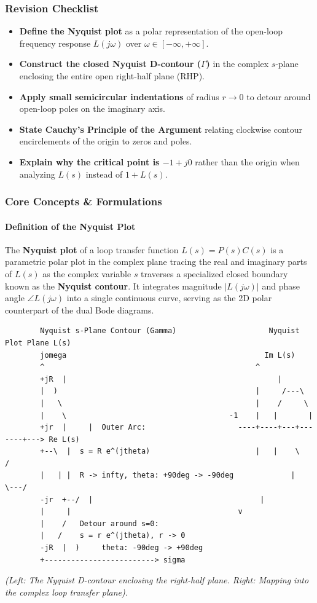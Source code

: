 \documentclass[12pt,onecolumn,twoside ]{article}
\begin{document}
	\subsubsection{Revision Checklist}
	\begin{itemize}
		\item[$\square$]
		\textbf{Define the Nyquist plot} as a polar representation of the open-loop frequency response $L(j\omega)$ over $\omega \in [-\infty, +\infty]$.
		\item[$\square$]
		\textbf{Construct the closed Nyquist D-contour ($\Gamma$)} in the complex $s$-plane enclosing the entire open right-half plane (RHP).
		\item[$\square$]
		\textbf{Apply small semicircular indentations} of radius $r \to 0$ to detour around open-loop poles on the imaginary axis.
		\item[$\square$]
		\textbf{State Cauchy’s Principle of the Argument} relating clockwise contour encirclements of the origin to zeros and poles.
		\item[$\square$]
		\textbf{Explain why the critical point is $-1 + j0$} rather than the origin when analyzing $L(s)$ instead of $1 + L(s)$.
	\end{itemize}
	
	\subsubsection{Core Concepts \& Formulations}
	\paragraph{Definition of the Nyquist Plot}
	The \textbf{Nyquist plot} of a loop transfer function $L(s) = P(s)C(s)$ is a parametric polar plot in the complex plane tracing the real and imaginary parts of $L(s)$ as the complex variable $s$ traverses a specialized closed boundary known as the \textbf{Nyquist contour}. It integrates magnitude $|L(j\omega)|$ and phase angle $\angle L(j\omega)$ into a single continuous curve, serving as the 2D polar counterpart of the dual Bode diagrams.
	\begin{lstlisting}
		Nyquist s-Plane Contour (Gamma)                     Nyquist Plot Plane L(s)
		jomega                                             Im L(s)
		^                                                ^
		+jR  |                                                |
		|  )                                             |     /---\
		|   \                                            |    /     \
		|    \                                     -1    |   |       |
		+jr  |     |  Outer Arc:                     ----+----+---+-------+---> Re L(s)
		+--\  |  s = R e^(jtheta)                        |   |    \     /
		|   | |  R -> infty, theta: +90deg -> -90deg             |    \---/
		-jr  +--/  |                                      |
		|     |                                      v
		|    /   Detour around s=0:
		|   /    s = r e^(jtheta), r -> 0
		-jR  |  )     theta: -90deg -> +90deg
		+-------------------------> sigma
	\end{lstlisting}
	\textit{(Left: The Nyquist D-contour enclosing the right-half plane. Right: Mapping into the complex loop transfer plane).}
\end{document}
